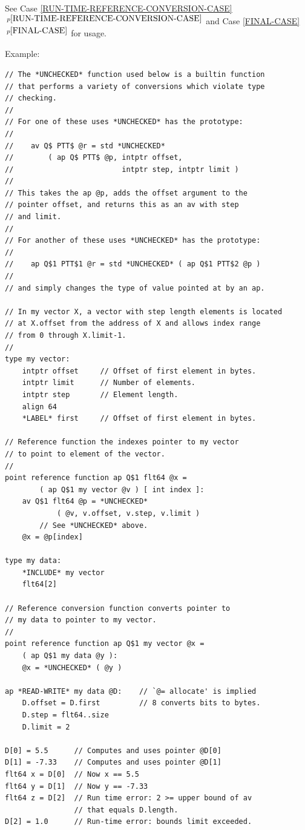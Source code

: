 \documentclass[12pt]{article}
\newcommand{\itemref}[1]{\ref{#1}$\,^{p\pageref{#1}}$}
\newenvironment{indpar}[1][0.3in]%
	{\begin{list}{}%
		     {\setlength{\itemsep}{0in}%
		      \setlength{\topsep}{0in}%
		      \setlength{\parsep}{1ex}%
		      \setlength{\labelwidth}{#1}%
		      \setlength{\leftmargin}{#1}%
		      \addtolength{\leftmargin}{\labelsep}}%
	 \item}%
	{\end{list}}
\begin{document}
See Case \itemref{RUN-TIME-REFERENCE-CONVERSION-CASE}
and Case \itemref{FINAL-CASE}
for usage.

\bigskip

Example:

\begin{indpar}\label{REFERENCE-FUNCTION-EXAMPLE}\begin{verbatim}
// The *UNCHECKED* function used below is a builtin function
// that performs a variety of conversions which violate type
// checking.
//
// For one of these uses *UNCHECKED* has the prototype:
//
//    av Q$ PTT$ @r = std *UNCHECKED*
//        ( ap Q$ PTT$ @p, intptr offset,
//                         intptr step, intptr limit )
//
// This takes the ap @p, adds the offset argument to the
// pointer offset, and returns this as an av with step
// and limit.
//
// For another of these uses *UNCHECKED* has the prototype:
//
//    ap Q$1 PTT$1 @r = std *UNCHECKED* ( ap Q$1 PTT$2 @p )
//
// and simply changes the type of value pointed at by an ap.

// In my vector X, a vector with step length elements is located
// at X.offset from the address of X and allows index range
// from 0 through X.limit-1.
//
type my vector:
    intptr offset     // Offset of first element in bytes.
    intptr limit      // Number of elements.
    intptr step       // Element length.
    align 64
    *LABEL* first     // Offset of first element in bytes.

// Reference function the indexes pointer to my vector
// to point to element of the vector.
//
point reference function ap Q$1 flt64 @x =
        ( ap Q$1 my vector @v ) [ int index ]:
    av Q$1 flt64 @p = *UNCHECKED*
            ( @v, v.offset, v.step, v.limit )
        // See *UNCHECKED* above.
    @x = @p[index]

type my data:
    *INCLUDE* my vector
    flt64[2]

// Reference conversion function converts pointer to
// my data to pointer to my vector.
//
point reference function ap Q$1 my vector @x =
    ( ap Q$1 my data @y ):
    @x = *UNCHECKED* ( @y )

ap *READ-WRITE* my data @D:    // `@= allocate' is implied
    D.offset = D.first         // 8 converts bits to bytes.
    D.step = flt64..size
    D.limit = 2

D[0] = 5.5      // Computes and uses pointer @D[0]
D[1] = -7.33    // Computes and uses pointer @D[1]
flt64 x = D[0]  // Now x == 5.5
flt64 y = D[1]  // Now y == -7.33
flt64 z = D[2]  // Run time error: 2 >= upper bound of av
                // that equals D.length.
D[2] = 1.0      // Run-time error: bounds limit exceeded.
\end{verbatim}\end{indpar}
\end{document}

